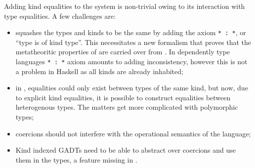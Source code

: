 \documentclass[manuscript,screen,nonacm]{acmart}
\begin{document}
Adding kind equalities to the system is non-trivial owing to its interaction with type equalities. A few challenges are:
\begin{itemize}
  \item \SFK squashes the types and kinds to be the same by adding the axiom \lstinline{* : *}, or ``type is of kind type''. This necessitates a new formalism that proves that the metatheoritic properties of \SFK are carried over from \SFC. In dependently type languages \lstinline{* : *} axiom amounts to adding inconsistency, however this is not a problem in Haskell as all kinds are already inhabited;
  \item in \SFC, equalities could only exist between types of the same kind, but now, due to explicit kind equalities, it is possible to construct equalities between heterogenous types. The matters get more complicated with polymorphic types;
  \item coercions should not interfere with the operational semantics of the language;
  \item Kind indexed GADTs need to be able to abstract over coercions and use them in the types, a feature missing in \SFC.
\end{itemize}
\end{document}

